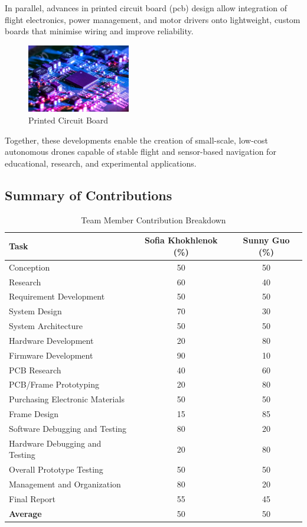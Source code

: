 In parallel, advances in printed circuit board (\gls{pcb}) design allow integration of flight electronics, power management, and motor drivers onto lightweight, custom boards that minimise wiring and improve reliability. 

\begin{figure}[H]
    \centering
    \captionsetup{justification=centering, margin=1cm}
    \includegraphics[width=0.4\textwidth]{img/intro-pcb.PNG}
    \caption{Printed Circuit Board \cite{mistral2020}}
\end{figure}

Together, these developments enable the creation of small-scale, low-cost autonomous drones capable of stable flight and sensor-based navigation for educational, research, and experimental applications.

\subsection{Summary of Contributions}

\begin{table}[H]
\centering
\caption{Team Member Contribution Breakdown}
\renewcommand{\arraystretch}{1.2}
\begin{tabular}{@{}lcc@{}}
\toprule
\textbf{Task} & \textbf{Sofia Khokhlenok (\%)} & \textbf{Sunny Guo (\%)} \\ 
\midrule
Conception & 50 & 50 \\
Research & 60 & 40 \\
Requirement Development & 50 & 50 \\
System Design & 70 & 30 \\
System Architecture & 50 & 50 \\
Hardware Development & 20 & 80 \\
Firmware Development & 90 & 10 \\
PCB Research & 40 & 60 \\
PCB/Frame Prototyping & 20 & 80 \\
Purchasing Electronic Materials & 50 & 50 \\
Frame Design & 15 & 85 \\
Software Debugging and Testing & 80 & 20 \\
Hardware Debugging and Testing & 20 & 80 \\
Overall Prototype Testing & 50 & 50 \\
Management and Organization & 80 & 20 \\
Final Report & 55 & 45 \\
\textbf{Average} & 50 & 50 \\
\bottomrule
\end{tabular}
\end{table}

